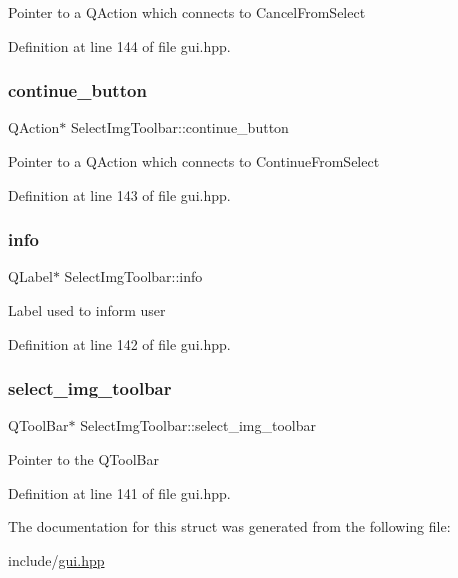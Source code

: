 Pointer to a Q\+Action which connects to Cancel\+From\+Select 

Definition at line 144 of file gui.\+hpp.

\mbox{\label{structSelectImgToolbar_a82569764f9d7e13b406a668e9e50290a}} 
\subsubsection{\texorpdfstring{continue\+\_\+button}{continue\_button}}
{\footnotesize\ttfamily Q\+Action$\ast$ Select\+Img\+Toolbar\+::continue\+\_\+button}

Pointer to a Q\+Action which connects to Continue\+From\+Select 

Definition at line 143 of file gui.\+hpp.

\mbox{\label{structSelectImgToolbar_a3cf6ac92fbe60877873c89939217e1de}} 
\subsubsection{\texorpdfstring{info}{info}}
{\footnotesize\ttfamily Q\+Label$\ast$ Select\+Img\+Toolbar\+::info}

Label used to inform user 

Definition at line 142 of file gui.\+hpp.

\mbox{\label{structSelectImgToolbar_a779bc326cf08c9fbcd1ffebb43a664eb}} 
\subsubsection{\texorpdfstring{select\+\_\+img\+\_\+toolbar}{select\_img\_toolbar}}
{\footnotesize\ttfamily Q\+Tool\+Bar$\ast$ Select\+Img\+Toolbar\+::select\+\_\+img\+\_\+toolbar}

Pointer to the Q\+Tool\+Bar 

Definition at line 141 of file gui.\+hpp.



The documentation for this struct was generated from the following file\+:\begin{DoxyCompactItemize}
\item 
include/\mbox{\hyperlink{gui_8hpp}{gui.\+hpp}}\end{DoxyCompactItemize}
